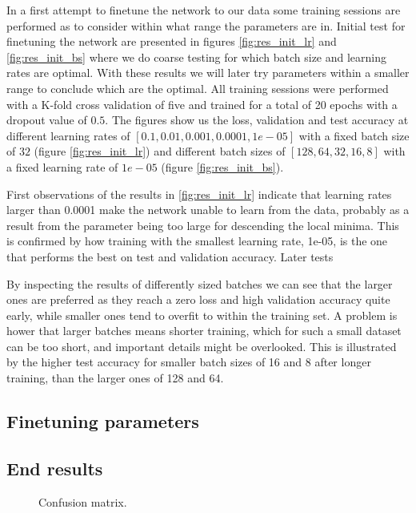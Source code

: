 In a first attempt to finetune the network to our data some training sessions are performed as to consider within what range the parameters are in. Initial test for finetuning the network are presented in figures \ref{fig:res_init_lr} and \ref{fig:res_init_bs} where we do coarse testing for which batch size and learning rates are optimal. With these results we will later try parameters within a smaller range to conclude which are the optimal. All training sessions were performed with a K-fold cross validation of five and trained for a total of 20 epochs with a dropout value of \(0.5\). The figures show us the loss, validation and test accuracy at different learning rates of \([0.1, 0.01, 0.001, 0.0001, 1e-05]\) with a fixed batch size of \(32\) (figure \ref{fig:res_init_lr}) and different batch sizes of \([128, 64, 32, 16, 8]\) with a fixed learning rate of \(1e-05\) (figure \ref{fig:res_init_bs}).

First observations of the results in \ref{fig:res_init_lr} indicate that learning rates larger than 0.0001 make the network unable to learn from the data, probably as a result from the parameter being too large for descending the local minima. This is confirmed by how training with the smallest learning rate, 1e-05, is the one that performs the best on test and validation accuracy. Later tests

By inspecting the results of differently sized batches we can see that the larger ones are preferred as they reach a zero loss and high validation accuracy quite early, while smaller ones tend to overfit to within the training set. A problem is hower that larger batches means shorter training, which for such a small dataset can be too short, and important details might be overlooked. This is illustrated by the higher test accuracy for smaller batch sizes of 16 and 8 after longer training, than the larger ones of 128 and 64.


\subsection{Finetuning parameters}

\subsection{End results}

\begin{figure}
	
	\caption{Confusion matrix.}
	\label{fig:confusion_matrix}
\end{figure}

